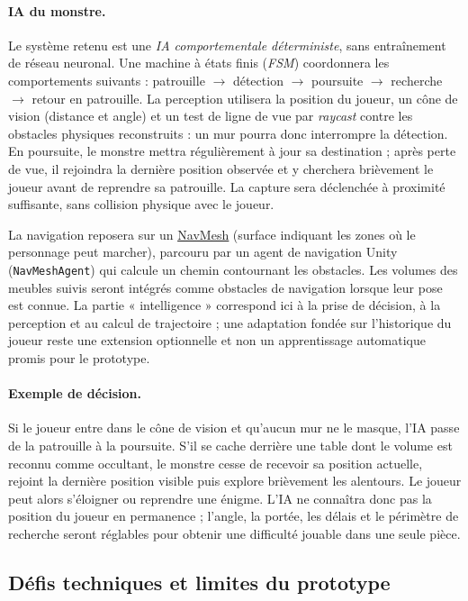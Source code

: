 \documentclass[11pt,a4paper]{article}
\newcommand{\doclink}[2]{\href{#1}{\textcolor{linkBlue}{\underline{#2}}}}
\begin{document}
\paragraph{IA du monstre.} Le système retenu est une \emph{IA comportementale déterministe}, sans entraînement de réseau neuronal. Une machine à états finis (\emph{FSM}) coordonnera les comportements suivants : patrouille $\rightarrow$ détection $\rightarrow$ poursuite $\rightarrow$ recherche $\rightarrow$ retour en patrouille. La perception utilisera la position du joueur, un cône de vision (distance et angle) et un test de ligne de vue par \emph{raycast} contre les obstacles physiques reconstruits : un mur pourra donc interrompre la détection. En poursuite, le monstre mettra régulièrement à jour sa destination ; après perte de vue, il rejoindra la dernière position observée et y cherchera brièvement le joueur avant de reprendre sa patrouille. La capture sera déclenchée à proximité suffisante, sans collision physique avec le joueur.

La navigation reposera sur un \doclink{https://developers.meta.com/vr/documentation/unity/unity-sample-mruk-navmesh/}{NavMesh} (surface indiquant les zones où le personnage peut marcher), parcouru par un agent de navigation Unity (\texttt{NavMeshAgent}) qui calcule un chemin contournant les obstacles. Les volumes des meubles suivis seront intégrés comme obstacles de navigation lorsque leur pose est connue. La partie « intelligence » correspond ici à la prise de décision, à la perception et au calcul de trajectoire ; une adaptation fondée sur l'historique du joueur reste une extension optionnelle et non un apprentissage automatique promis pour le prototype.

\paragraph{Exemple de décision.} Si le joueur entre dans le cône de vision et qu'aucun mur ne le masque, l'IA passe de la patrouille à la poursuite. S'il se cache derrière une table dont le volume est reconnu comme occultant, le monstre cesse de recevoir sa position actuelle, rejoint la dernière position visible puis explore brièvement les alentours. Le joueur peut alors s'éloigner ou reprendre une énigme. L'IA ne connaîtra donc pas la position du joueur en permanence ; l'angle, la portée, les délais et le périmètre de recherche seront réglables pour obtenir une difficulté jouable dans une seule pièce.

\subsection{Défis techniques et limites du prototype}
\end{document}

